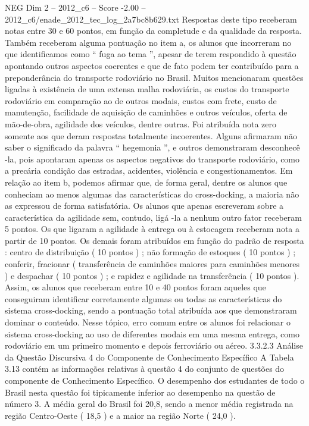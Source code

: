 \begin{textsample}{NEG Dim 2 – 2012\_c6 – Score -2.00 – 2012\_c6/enade\_2012\_tec\_log\_2a7bc8b629.txt}
Respostas deste tipo receberam notas entre 30 e 60 pontos, em função da completude e da qualidade da resposta.
Também receberam alguma pontuação no item a, os alunos que incorreram no que identificamos como “ fuga ao tema ”, apesar de terem respondido à questão apontando outros aspectos coerentes e que de fato podem ter contribuído para a preponderância do transporte rodoviário no Brasil.
Muitos mencionaram questões ligadas à existência de uma extensa malha rodoviária, os custos do transporte rodoviário em comparação ao de outros modais, custos com frete, custo de manutenção, facilidade de aquisição de caminhões e outros veículos, oferta de mão-de-obra, agilidade dos veículos, dentre outras.
Foi atribuída nota zero somente aos que deram respostas totalmente incoerentes.
Alguns afirmaram não saber o significado da palavra “ hegemonia ”, e outros demonstraram desconhecê -la, pois apontaram apenas os aspectos negativos do transporte rodoviário, como a precária condição das estradas, acidentes, violência e congestionamentos.
Em relação ao item b, podemos afirmar que, de forma geral, dentre os alunos que conheciam ao menos algumas das características do cross-docking, a maioria não as expressou de forma satisfatória.
Os alunos que apenas escreveram sobre a característica da agilidade sem, contudo, ligá -la a nenhum outro fator receberam 5 pontos.
Os que ligaram a agilidade à entrega ou à estocagem receberam nota a partir de 10 pontos.
Os demais foram atribuídos em função do padrão de resposta : centro de distribuição ( 10 pontos ) ; não formação de estoques ( 10 pontos ) ; conferir, fracionar ( transferência de caminhões maiores para caminhões menores ) e despachar ( 10 pontos ) ; e rapidez e agilidade na transferência ( 10 pontos ).
Assim, os alunos que receberam entre 10 e 40 pontos foram aqueles que conseguiram identificar corretamente algumas ou todas as características do sistema cross-docking, sendo a pontuação total atribuída aos que demonstraram dominar o conteúdo.
Nesse tópico, erro comum entre os alunos foi relacionar o sistema cross-docking ao uso de diferentes modais em uma mesma entrega, como rodoviário em um primeiro momento e depois ferroviário ou aéreo. 3.3.2.3 Análise da Questão Discursiva 4 do Componente de Conhecimento Específico A Tabela 3.13 contém as informações relativas à questão 4 do conjunto de questões do componente de Conhecimento Específico.
O desempenho dos estudantes de todo o Brasil nesta questão foi tipicamente inferior ao desempenho na questão de número 3.
A média geral do Brasil foi 20,8, sendo a menor média registrada na região Centro-Oeste ( 18,5 ) e a maior na região Norte ( 24,0 ).

\end{textsample}
